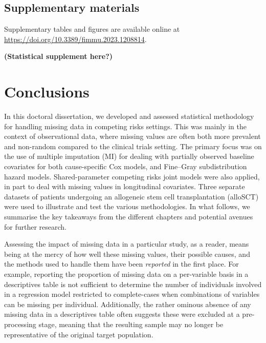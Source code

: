 \documentclass[
  letterpaper,
  DIV=11,
  numbers=noendperiod]{scrreprt}
\begin{document}
\section*{Supplementary materials}\label{supplementary-materials-5}


Supplementary tables and figures are available online at
\url{https://doi.org/10.3389/fimmu.2023.1208814}.

\textbf{(Statistical supplement here?)}


\chapter{Conclusions}\label{sec-chap-discussion}

In this doctoral dissertation, we developed and assessed statistical
methodology for handling missing data in competing risks settings. This
was mainly in the context of observational data, where missing values
are often both more prevalent and non-random compared to the clinical
trials setting. The primary focus was on the use of multiple imputation
(MI) for dealing with partially observed baseline covariates for both
cause-specific Cox models, and Fine--Gray subdistribution hazard models.
Shared-parameter competing risks joint models were also applied, in part
to deal with missing values in longitudinal covariates. Three separate
datasets of patients undergoing an allogeneic stem cell transplantation
(alloSCT) were used to illustrate and test the various methodologies. In
what follows, we summarise the key takeaways from the different chapters
and potential avenues for further research.

Assessing the impact of missing data in a particular study, as a reader,
means being at the mercy of how well these missing values, their
possible causes, and the methods used to handle them have been
\emph{reported} in the first place. For example, reporting the
proportion of missing data on a per-variable basis in a descriptives
table is not sufficient to determine the number of individuals involved
in a regression model restricted to complete-cases when combinations of
variables can be missing per individual. Additionally, the rather
ominous absence of any missing data in a descriptives table often
suggests these were excluded at a pre-processing stage, meaning that the
resulting sample may no longer be representative of the original target
population.
\end{document}
